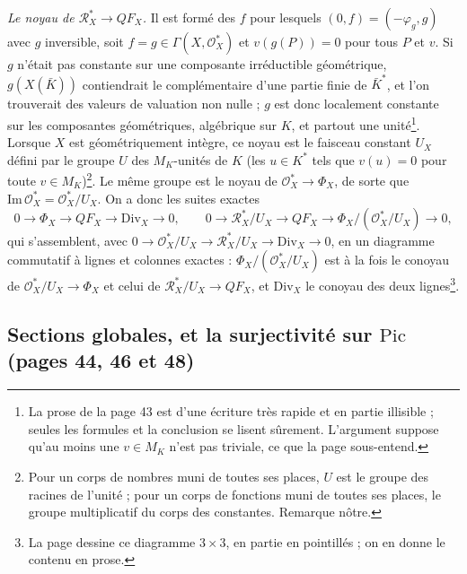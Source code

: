 \documentclass[11pt,a4paper]{article}
\begin{document}
\emph{Le noyau de $\mathcal{R}^*_X \to QF_X$.} Il est formé des $f$
pour lesquels $(0, f) = (-\varphi_g, g)$ avec $g$ inversible, soit
$f = g \in \Gamma(X, \mathcal{O}_X^*)$ et $v(g(P)) = 0$ pour tous $P$ et $v$.
Si $g$ n'était pas constante sur une composante irréductible géométrique,
$g(X(\bar K))$ contiendrait le complémentaire d'une partie finie de
$\bar K^*$, et l'on trouverait des valeurs de valuation non nulle ; $g$ est
donc localement constante sur les composantes géométriques, algébrique sur
$K$, et partout une unité\footnote{La prose de la page 43 est d'une écriture
très rapide et en partie illisible ; seules les formules et la conclusion
se lisent sûrement. L'argument suppose qu'au moins une $v \in M_K$ n'est pas
triviale, ce que la page sous-entend.}. Lorsque $X$ est géométriquement
intègre, ce noyau est le faisceau constant $U_X$ défini par le groupe $U$
des $M_K$-unités de $K$ (les $u \in K^*$ tels que $v(u) = 0$ pour toute
$v \in M_K$)\footnote{Pour un corps de nombres muni de toutes ses places, $U$
est le groupe des racines de l'unité ; pour un corps de fonctions muni de
toutes ses places, le groupe multiplicatif du corps des constantes.
Remarque nôtre.}. Le même groupe est le noyau de $\mathcal{O}_X^* \to
\Phi_X$, de sorte que $\mathrm{Im}\,\mathcal{O}_X^* = \mathcal{O}_X^*/U_X$.
On a donc les suites exactes
\[
  0 \to \Phi_X \to QF_X \to \mathrm{Div}_X \to 0, \qquad
  0 \to \mathcal{R}^*_X/U_X \to QF_X \to \Phi_X/(\mathcal{O}_X^*/U_X) \to 0,
\]
qui s'assemblent, avec $0 \to \mathcal{O}_X^*/U_X \to \mathcal{R}^*_X/U_X \to
\mathrm{Div}_X \to 0$, en un diagramme commutatif à lignes et colonnes
exactes : $\Phi_X/(\mathcal{O}_X^*/U_X)$ est à la fois le conoyau de
$\mathcal{O}^*_X/U_X \to \Phi_X$ et celui de $\mathcal{R}^*_X/U_X \to QF_X$,
et $\mathrm{Div}_X$ le conoyau des deux lignes\footnote{La page dessine ce
diagramme $3 \times 3$, en partie en pointillés ; on en donne le contenu en
prose.}.

\subsection*{Sections globales, et la surjectivité sur $\mathrm{Pic}$ (pages 44, 46 et 48)}
\end{document}
